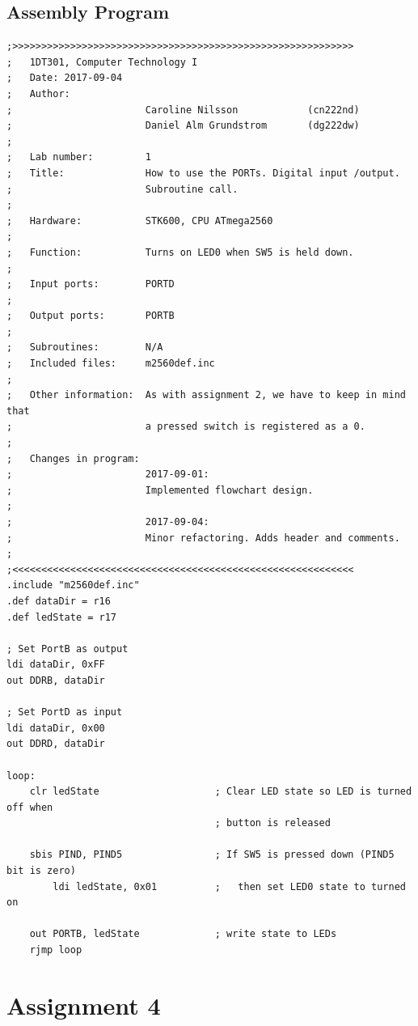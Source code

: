 \documentclass[a4paper, 12pt]{article}
\begin{document}
\subsection{Assembly Program}
\begin{lstlisting}[basicstyle=\tiny]
;>>>>>>>>>>>>>>>>>>>>>>>>>>>>>>>>>>>>>>>>>>>>>>>>>>>>>>>>>>>
;   1DT301, Computer Technology I
;   Date: 2017-09-04
;   Author:
;                       Caroline Nilsson            (cn222nd)
;                       Daniel Alm Grundstrom       (dg222dw)
;
;   Lab number:         1
;   Title:              How to use the PORTs. Digital input /output.
;                       Subroutine call.
;
;   Hardware:           STK600, CPU ATmega2560
;
;   Function:           Turns on LED0 when SW5 is held down.
;
;   Input ports:        PORTD
;
;   Output ports:       PORTB
;
;   Subroutines:        N/A
;   Included files:     m2560def.inc
;
;   Other information:  As with assignment 2, we have to keep in mind that
;                       a pressed switch is registered as a 0.
;
;   Changes in program: 
;                       2017-09-01:
;                       Implemented flowchart design.
;
;                       2017-09-04:
;                       Minor refactoring. Adds header and comments.
;
;<<<<<<<<<<<<<<<<<<<<<<<<<<<<<<<<<<<<<<<<<<<<<<<<<<<<<<<<<<<
.include "m2560def.inc"
.def dataDir = r16
.def ledState = r17

; Set PortB as output
ldi dataDir, 0xFF
out DDRB, dataDir

; Set PortD as input
ldi dataDir, 0x00
out DDRD, dataDir

loop:
    clr ledState                    ; Clear LED state so LED is turned off when
                                    ; button is released

    sbis PIND, PIND5                ; If SW5 is pressed down (PIND5 bit is zero)
        ldi ledState, 0x01          ;   then set LED0 state to turned on

    out PORTB, ledState             ; write state to LEDs
    rjmp loop

\end{lstlisting}
\newpage

\section{Assignment 4}
\begin{algorithm}
\begin{algorithmic}
\State{}
\EndProcedure
\caption{}
\label{}
\end{algorithmic}
\end{algorithm}
\end{document}

